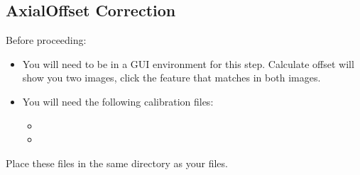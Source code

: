 \documentclass[letterpaper,10pt,english]{sphinxmanual}
\begin{document}
\sphinxstepscope


\subsection{Axial\sphinxhyphen{}Offset Correction}
\label{\detokenize{user_guide/offset_correction:axial-offset-correction}}\label{\detokenize{user_guide/offset_correction:offset-correction}}\label{\detokenize{user_guide/offset_correction::doc}}
\sphinxAtStartPar
Before proceeding:
\begin{itemize}
\item {} 
\sphinxAtStartPar
You will need to be in a GUI environment for this step. Calculate offset will show you two images, click the feature that matches in both images.

\item {} 
\sphinxAtStartPar
You will need the following calibration files:
\begin{itemize}
\item {} 
\sphinxAtStartPar
{}

\item {} 
\sphinxAtStartPar
{}

\end{itemize}

\end{itemize}

\sphinxAtStartPar
Place these files in the same directory as your  files.
\end{document}
